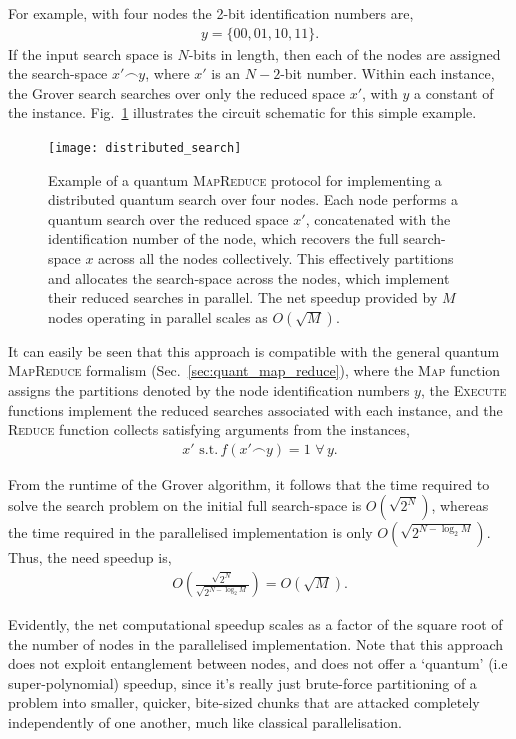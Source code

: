 For example, with four nodes the 2-bit identification numbers are, 
\begin{align}
	y=\{00,01,10,11\}.
\end{align}
If the input search space is $N$-bits in length, then each of the nodes are assigned the search-space \mbox{$x'\frown y$}, where $x'$ is an \mbox{$N-2$}-bit number. Within each instance, the Grover search searches over only the reduced space $x'$, with $y$ a constant of the instance. Fig.~\ref{fig:distributed_search} illustrates the circuit schematic for this simple example.

\begin{figure}[!htbp]
	\texttt{[image: distributed\_search]}
	\caption{Example of a quantum \textsc{MapReduce} protocol for implementing a distributed quantum search over four nodes. Each node performs a quantum search over the reduced space $x'$, concatenated with the identification number of the node, which recovers the full search-space $x$ across all the nodes collectively. This effectively partitions and allocates the search-space across the nodes, which implement their reduced searches in parallel. The net speedup provided by $M$ nodes operating in parallel scales as $O(\sqrt{M})$.}\label{fig:distributed_search}
\end{figure}

It can easily be seen that this approach is compatible with the general quantum \textsc{MapReduce} formalism (Sec.~\ref{sec:quant_map_reduce}), where the \textsc{Map} function assigns the partitions denoted by the node identification numbers $y$, the \textsc{Execute} functions implement the reduced searches associated with each instance, and the \textsc{Reduce} function collects satisfying arguments from the instances,
\begin{align}
	x'\,\, \mathrm{s.t.}\, f(x'\frown y)=1\,\,\forall\, y.
\end{align}

From the runtime of the Grover algorithm, it follows that the time required to solve the search problem on the initial full search-space is $O(\sqrt{2^N})$, whereas the time required in the parallelised implementation is only $O(\sqrt{2^{N-\log_2 M}})$. Thus, the need speedup is,
\begin{align}
	O\left(\frac{\sqrt{2^N}}{\sqrt{2^{N-\log_2 M}}}\right) = O(\sqrt{M}).
\end{align}

Evidently, the net computational speedup scales as a factor of the square root of the number of nodes in the parallelised implementation. Note that this approach does not exploit entanglement between nodes, and does not offer a `quantum' (i.e super-polynomial) speedup, since it's really just brute-force partitioning of a problem into smaller, quicker, bite-sized chunks that are attacked completely independently of one another, much like classical parallelisation.

